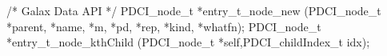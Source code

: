 \begin{code}
/* Galax Data API */
PDCI\_node\_t *entry\_t\_node\_new (PDCI\_node\_t *parent,  *name, *m,
                                *pd, *rep,  *kind,  *whatfn);
PDCI\_node\_t *entry\_t\_node\_kthChild (PDCI\_node\_t *self,PDCI\_childIndex\_t idx);
\end{code}
